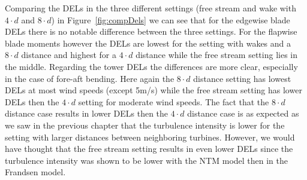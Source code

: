 \documentclass[10pt]{article}
\begin{document}
Comparing the DELs in the three different settings (free stream and wake with $4\cdot d$ and $8\cdot d$) in Figure~\ref{fig:compDels} we can see that for the edgewise blade DELs there is no notable difference between the three settings. For the flapwise blade moments however the DELs are lowest for the setting with wakes and a $8\cdot d$ distance and highest for a $4\cdot d$ distance while the free stream setting lies in the middle.
Regarding the tower DELs the differences are more clear, especially in the case of fore-aft bending. Here again the $8\cdot d$ distance setting has lowest DELs at most wind speeds (except 5m/s) while the free stream setting has lower DELs then the $4\cdot d$ setting for moderate wind speeds.
The fact that the $8\cdot d$ distance case results in lower DELs then the $4\cdot d$ distance case is as expected as we saw in the previous chapter that the turbulence intensity is lower for the setting with larger distances between neighboring turbines. However, we would have thought that the free stream setting results in even lower DELs since the turbulence intensity was shown to be lower with the NTM model then in the Frandsen model. 
\end{document}

